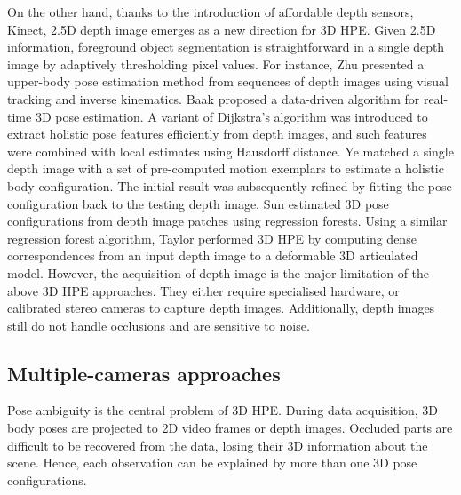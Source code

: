 On the other hand, thanks to the introduction of affordable depth sensors, \eg Kinect, 2.5D depth image emerges as a new direction for 3D HPE.
Given 2.5D information, foreground object segmentation is straightforward in a single depth image by adaptively thresholding pixel values.   
For instance, Zhu \etal \cite{Zhu2008a} presented a upper-body pose estimation method from sequences of depth images using visual tracking and inverse kinematics. 
Baak \etal \cite{Baak2011} proposed a data-driven algorithm for real-time 3D pose estimation. A variant of Dijkstra's algorithm was introduced to extract holistic pose features efficiently from depth images, and such features were combined with local estimates using Hausdorff distance. 
Ye \etal \cite{Ye2011} matched a single depth image with a set of pre-computed motion exemplars to estimate a holistic body configuration. The initial result was subsequently refined by fitting the pose configuration back to the testing depth image. 
Sun \etal \cite{Sun2012} estimated 3D pose configurations from depth image patches using regression forests.  
Using a similar regression forest algorithm, Taylor \etal \cite{Taylor2012} performed 3D HPE by computing dense correspondences from an input depth image to a deformable 3D articulated model.  
However, the acquisition of depth image is the major limitation of the above 3D HPE approaches. They either require specialised hardware, or calibrated stereo cameras to capture depth images. Additionally, depth images still do not handle occlusions and are sensitive to noise. 



\subsection{Multiple-cameras approaches} 

Pose ambiguity is the central problem of 3D HPE. 
During data acquisition, 3D body poses are projected to 2D video frames or depth images. Occluded parts are difficult to be recovered from the data, losing their 3D information about the scene. Hence, each observation can be explained by more than one 3D pose configurations. 

